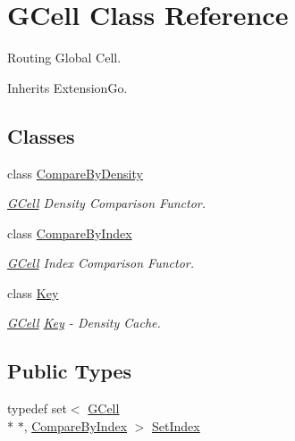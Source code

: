 \hypertarget{classKatabatic_1_1GCell}{\section{G\-Cell Class Reference}
\label{classKatabatic_1_1GCell}
}


Routing Global Cell.  




Inherits Extension\-Go.

\subsection*{Classes}
\begin{DoxyCompactItemize}
\item 
class \hyperlink{classKatabatic_1_1GCell_1_1CompareByDensity}{Compare\-By\-Density}
\begin{DoxyCompactList}\small\item\em \hyperlink{classKatabatic_1_1GCell}{G\-Cell} Density Comparison Functor. \end{DoxyCompactList}\item 
class \hyperlink{classKatabatic_1_1GCell_1_1CompareByIndex}{Compare\-By\-Index}
\begin{DoxyCompactList}\small\item\em \hyperlink{classKatabatic_1_1GCell}{G\-Cell} Index Comparison Functor. \end{DoxyCompactList}\item 
class \hyperlink{classKatabatic_1_1GCell_1_1Key}{Key}
\begin{DoxyCompactList}\small\item\em \hyperlink{classKatabatic_1_1GCell}{G\-Cell} \hyperlink{classKatabatic_1_1GCell_1_1Key}{Key} -\/ Density Cache. \end{DoxyCompactList}\end{DoxyCompactItemize}
\subsection*{Public Types}
\begin{DoxyCompactItemize}
\item 
typedef set$<$ \hyperlink{classKatabatic_1_1GCell}{G\-Cell} \\*
$\ast$, \hyperlink{classKatabatic_1_1GCell_1_1CompareByIndex}{Compare\-By\-Index} $>$ \hyperlink{classKatabatic_1_1GCell_aacb1c215b203bfba5729f135b3221d40}{Set\-Index}
\end{DoxyCompactItemize}

